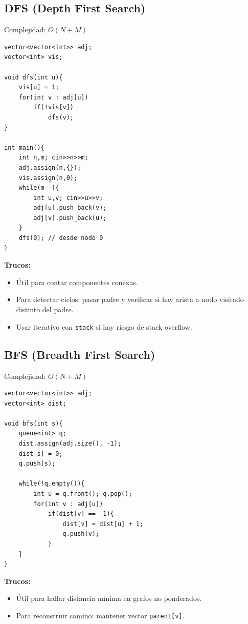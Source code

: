 \documentclass{article}
\begin{document}
\subsection{DFS (Depth First Search)}

Complejidad: \(O(N + M)\)

\begin{lstlisting}[style=cppstyle]
vector<vector<int>> adj;
vector<int> vis;

void dfs(int u){
    vis[u] = 1;
    for(int v : adj[u])
        if(!vis[v])
            dfs(v);
}

int main(){
    int n,m; cin>>n>>m;
    adj.assign(n,{});
    vis.assign(n,0);
    while(m--){
        int u,v; cin>>u>>v;
        adj[u].push_back(v);
        adj[v].push_back(u);
    }
    dfs(0); // desde nodo 0
}
\end{lstlisting}

\textbf{Trucos:}
\begin{itemize}
  \item Útil para contar componentes conexas.
  \item Para detectar ciclos: pasar padre y verificar si hay arista a nodo visitado distinto del padre.
  \item Usar iterativo con \lstinline|stack| si hay riesgo de stack overflow.
\end{itemize}


\subsection{BFS (Breadth First Search)}

Complejidad: \(O(N + M)\)

\begin{lstlisting}[style=cppstyle]
vector<vector<int>> adj;
vector<int> dist;

void bfs(int s){
    queue<int> q;
    dist.assign(adj.size(), -1);
    dist[s] = 0;
    q.push(s);

    while(!q.empty()){
        int u = q.front(); q.pop();
        for(int v : adj[u])
            if(dist[v] == -1){
                dist[v] = dist[u] + 1;
                q.push(v);
            }
    }
}
\end{lstlisting}

\textbf{Trucos:}
\begin{itemize}
  \item Útil para hallar distancia mínima en grafos no ponderados.
  \item Para reconstruir camino: mantener vector \lstinline|parent[v]|.
\end{itemize}
\end{document}
